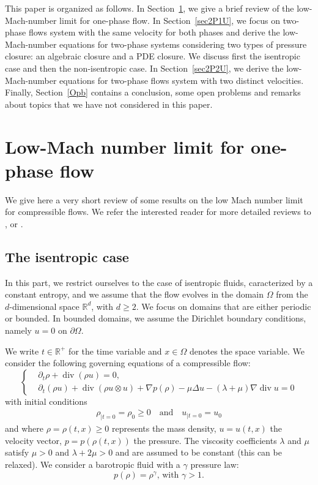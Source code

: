 \documentclass[11pt, twoside, a4paper]{article}
\theoremstyle{plain}
\theoremstyle{remark}
\numberwithin{equation}{section}
\def\R{{\mathbb R}}%
\renewcommand{\div}{\operatorname{div}}
\renewcommand{\geq}{\geqslant}\renewcommand{\ge}{\geqslant}
\newcommand{\dt}{\partial_t}
\begin{document}
This paper is organized as follows. In Section~\ref{seconeP}, we give a brief review of the low-Mach-number limit for one-phase flow. In Section~\ref{sec2P1U}, we focus on two-phase flows system with the same velocity for both phases and derive the low-Mach-number equations for two-phase systems considering two types of pressure closure: an algebraic closure and a PDE closure. We discuss first the isentropic case and then the non-isentropic case. In Section~\ref{sec2P2U}, we derive the low-Mach-number equations for two-phase flows system with two distinct velocities. Finally, Section~\ref{Opb} contains a conclusion, some open problems and remarks about topics that we have not considered in this paper.


\section{Low-Mach number limit for one-phase flow}\label{seconeP}

We give here a very short review of some results on the low Mach number limit for compressible flows. We refer the interested reader for more detailed reviews to \cite{schochet2005mathematical}, \cite{gallagher2005resultats} or \cite{alazard2008minicourse}.

\subsection{The isentropic case}

In this part, we restrict ourselves to the case of isentropic fluids, caracterized by a constant entropy, and we assume that the flow evolves in the domain $\Omega$ from the $d$-dimensional space $\R^d$, with $d \geq 2$. We focus on domains that are either periodic or bounded. In bounded domains, we assume the Dirichlet boundary conditions, namely $u=0$ on $\partial \Omega$.

We write $t\in \R^+$ for the time variable and $x \in \Omega$ denotes the space variable. We consider the following governing equations of a compressible flow: 
\begin{equation}
\left\{
\begin{aligned}\label{Sys1}
    &\dt \rho + \div (\rho u) = 0,\\
    &\dt (\rho u) + \div (\rho u \otimes u) + \nabla p(\rho) - \mu \Delta u - (\lambda + \mu)\nabla \div u =0
\end{aligned}
\right.
\end{equation}
with initial conditions
\begin{align*}
    \rho_{\lvert t=0} = \rho_0 \geq 0 \quad \text{and} \quad u_{\lvert t=0} = u_0
\end{align*}
and where $\rho = \rho(t,x) \geq 0$ represents the mass density, $u = u(t,x)$ the velocity vector, $p=p(\rho(t,x))$ the pressure. The viscosity coefficients $\lambda$ and $\mu$ satisfy $\mu >0$ and $\lambda + 2\mu>0$ and are assumed to be constant (this can be relaxed). We consider a barotropic fluid with a $\gamma$ pressure law: 
\[
p(\rho) = \rho^\gamma\text{, with }\gamma >1.
\]
\end{document}
